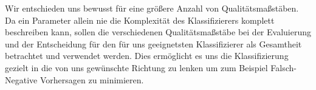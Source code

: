 Wir entschieden uns bewusst für eine größere Anzahl von Qualitätsmaßstäben. Da ein Parameter allein nie die Komplexität des Klassifizierers komplett beschreiben kann, sollen die verschiedenen Qualitätsmaßstäbe bei der Evaluierung und der Entscheidung für den für uns geeignetsten Klassifizierer als Gesamtheit betrachtet und verwendet werden. Dies ermöglicht es uns die Klassifizierung gezielt in die von uns gewünschte Richtung zu lenken um zum Beispiel Falsch-Negative Vorhersagen zu minimieren.
